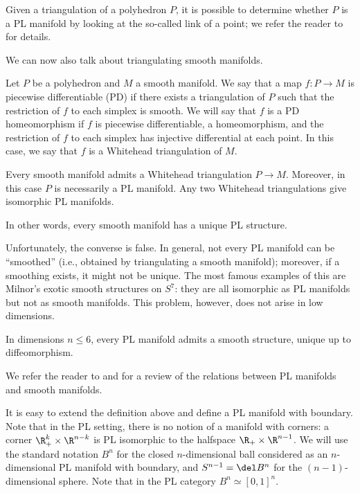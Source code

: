 Given a triangulation of a polyhedron $P$, it is possible to determine whether
$P$ is a PL manifold by looking at the so-called link of a point; we refer the
reader to \cite{rourke} for details.

We can now also talk about triangulating smooth manifolds.

\begin{definition}\label{d:whitehead-triangulation}
Let $P$ be a polyhedron and $M$ a smooth manifold. We say that a map $f\colon
P\to M$ is piecewise differentiable (PD) if there exists a triangulation of $P$
such that the restriction of $f$ to each simplex is smooth. We will say that $f$
is a PD homeomorphism if $f$ is piecewise differentiable, a homeomorphism, and
the restriction of $f$ to each simplex has injective differential at each point.
In this case, we say that $f$ is a Whitehead triangulation of $M$.
\end{definition}

\begin{theorem}\label{t:whitehead}
  Every smooth manifold admits a Whitehead triangulation $P \to M$. Moreover, in
  this case $P$ is necessarily a PL manifold. Any two Whitehead triangulations
  give isomorphic PL manifolds.
\end{theorem}

In other words, every smooth manifold has a unique PL structure.

Unfortunately, the converse is false. In general, not every PL manifold can be
``smoothed'' (i.e., obtained by triangulating a smooth manifold); moreover, if
a smoothing exists, it might not be unique. The most famous examples of this are
Milnor's exotic smooth structures on $S^7$: they are all isomorphic as PL
manifolds but not as smooth manifolds. This problem,
however, does not arise in low dimensions.

\begin{theorem}\label{t:PL-smooth}
    In dimensions $n\le 6$, every PL manifold admits a smooth structure,
    unique up to diffeomorphism.
\end{theorem}
We refer the reader to \cite{milnor-review} and \cite[Lecture 23]{lurie-PL}
for a review of the relations between PL manifolds and smooth manifolds.



It is easy to extend the definition above and define a PL manifold with
boundary. Note that in the PL setting, there is no notion of a manifold with
corners: a corner $\R_+^k \times \R^{n-k}$ is PL isomorphic to the halfspace
$\R_+\times \R^{n-1}$. We will use the standard notation $B^n$ for the closed
$n$-dimensional ball considered as an $n$-dimensional PL manifold with boundary,
and $S^{n-1}=\del B^n$ for the $(n-1)$-dimensional sphere. Note that in the PL
category $B^n\simeq [0,1]^n$.

